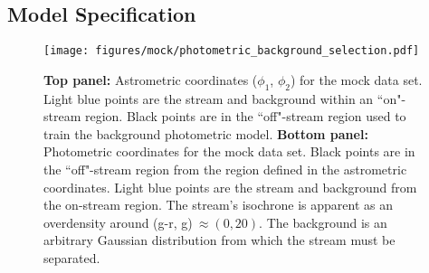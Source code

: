 \documentclass[twocolumn]{aastex631}
\begin{document}
    \subsection{Model Specification} \label{sub:results_mock:model}

        \begin{figure}
            \centering
            \texttt{[image: figures/mock/photometric\_background\_selection.pdf]}
            \caption{
                \textbf{Top panel:} Astrometric coordinates ($\phi_1$, $\phi_2$)
                for the mock data set.  Light blue points are the stream and
                background within an ``on"-stream region. Black points are in
                the ``off"-stream region used to train the background
                photometric model.
                \textbf{Bottom panel:} Photometric coordinates for the mock data
                set.  Black points are in the ``off"-stream region from the
                region defined in the astrometric coordinates.  Light blue
                points are the stream and background from the on-stream region.
                The stream's isochrone is apparent as an overdensity around
                (g-r, g)$\ \approx (0, 20)$.  The background is an arbitrary
                Gaussian distribution from which the stream must be separated.
            }
            \label{fig:mock_data_photometric_background_selection}
        \end{figure}
\end{document}
